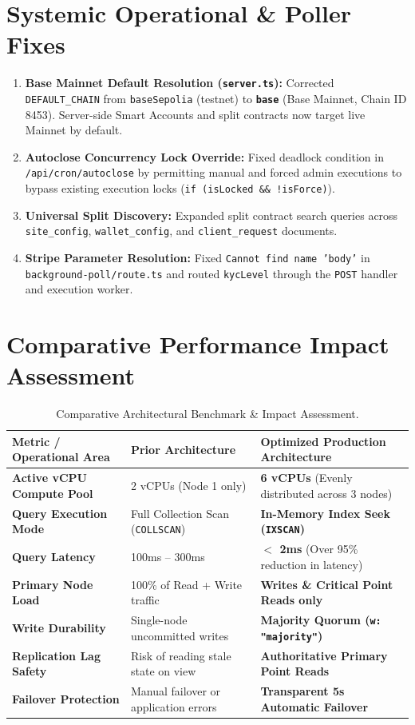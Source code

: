 \documentclass[11pt,a4paper]{article}
\begin{document}
\section{Systemic Operational \& Poller Fixes}

\begin{enumerate}
    \item \textbf{Base Mainnet Default Resolution (\texttt{server.ts}):} Corrected \texttt{DEFAULT\_CHAIN} from \texttt{baseSepolia} (testnet) to \textbf{\texttt{base}} (Base Mainnet, Chain ID 8453). Server-side Smart Accounts and split contracts now target live Mainnet by default.
    \item \textbf{Autoclose Concurrency Lock Override:} Fixed deadlock condition in \texttt{/api/cron/autoclose} by permitting manual and forced admin executions to bypass existing execution locks (\texttt{if (isLocked \&\& !isForce)}).
    \item \textbf{Universal Split Discovery:} Expanded split contract search queries across \texttt{site\_config}, \texttt{wallet\_config}, and \texttt{client\_request} documents.
    \item \textbf{Stripe Parameter Resolution:} Fixed \texttt{Cannot find name 'body'} in \texttt{background-poll/route.ts} and routed \texttt{kycLevel} through the \texttt{POST} handler and execution worker.
\end{enumerate}

\section{Comparative Performance Impact Assessment}

\begin{table}[h!]
\centering
\small
\begin{tabularx}{\textwidth}{lXX}
\toprule
\textbf{Metric / Operational Area} & \textbf{Prior Architecture} & \textbf{Optimized Production Architecture} \\
\midrule
\textbf{Active vCPU Compute Pool} & 2 vCPUs (Node 1 only) & \textbf{6 vCPUs} (Evenly distributed across 3 nodes) \\
\textbf{Query Execution Mode} & Full Collection Scan (\texttt{COLLSCAN}) & \textbf{In-Memory Index Seek (\texttt{IXSCAN})} \\
\textbf{Query Latency} & 100ms -- 300ms & \textbf{$<$ 2ms} (Over 95\% reduction in latency) \\
\textbf{Primary Node Load} & 100\% of Read + Write traffic & \textbf{Writes \& Critical Point Reads only} \\
\textbf{Write Durability} & Single-node uncommitted writes & \textbf{Majority Quorum (\texttt{w: "majority"})} \\
\textbf{Replication Lag Safety} & Risk of reading stale state on view & \textbf{Authoritative Primary Point Reads} \\
\textbf{Failover Protection} & Manual failover or application errors & \textbf{Transparent 5s Automatic Failover} \\
\bottomrule
\end{tabularx}
\caption{Comparative Architectural Benchmark \& Impact Assessment.}
\end{table}
\end{document}
